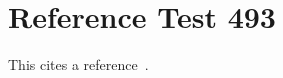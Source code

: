 \documentclass{article}
\begin{document}
\section{Reference Test 493}
This cites a reference~\cite{test493}.

\end{document}
